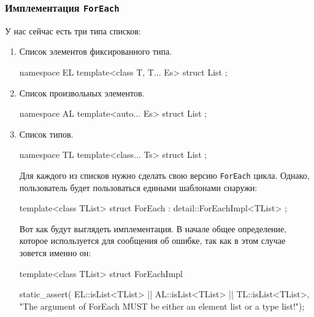 \subsubsection{Имплементация \texttt{ForEach}}

У нас сейчас есть три типа списков:
\begin{enumerate}
\item Список элементов фиксированного типа.
\begin{cppcode}[numbers = none]
namespace EL {
template<class T, T... Es>
struct List {};
}
\end{cppcode}

\item Список произвольных элементов.
\begin{cppcode}[numbers = none]
namespace AL {
template<auto... Es>
struct List {};
}
\end{cppcode}

\item Список типов.
\begin{cppcode}[numbers = none]
namespace TL {
template<class... Ts>
struct List {};
}
\end{cppcode}
Для каждого из списков нужно сделать свою версию \verb"ForEach" цикла.
Однако, пользователь будет пользоваться едиными шаблонами снаружи:
\begin{cppcode}
template<class TList>
struct ForEach : detail::ForEachImpl<TList> {};
\end{cppcode}
Вот как будут выглядеть имплементация.
В начале общее определение, которое используется для сообщения об ошибке, так как в этом случае зовется именно он:
\begin{cppcode}
template<class TList>
struct ForEachImpl {
  static_assert(
      EL::isList<TList> || AL::isList<TList> || TL::isList<TList>,
      "The argument of ForEach MUST be either an element list or a type list!");

}
\end{cppcode}
\end{enumerate}
